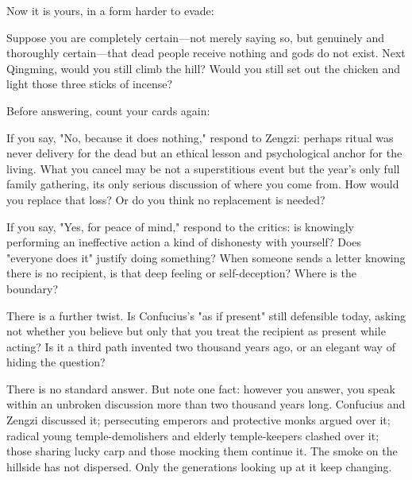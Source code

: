 Now it is yours, in a form harder to evade:

Suppose you are completely certain---not merely saying so, but genuinely and thoroughly certain---that dead people receive nothing and gods do not exist. Next Qingming, would you still climb the hill? Would you still set out the chicken and light those three sticks of incense?

Before answering, count your cards again:

If you say, "No, because it does nothing," respond to Zengzi: perhaps ritual was never delivery for the dead but an ethical lesson and psychological anchor for the living. What you cancel may be not a superstitious event but the year's only full family gathering, its only serious discussion of where you come from. How would you replace that loss? Or do you think no replacement is needed?

If you say, "Yes, for peace of mind," respond to the critics: is knowingly performing an ineffective action a kind of dishonesty with yourself? Does "everyone does it" justify doing something? When someone sends a letter knowing there is no recipient, is that deep feeling or self-deception? Where is the boundary?

There is a further twist. Is Confucius's "as if present" still defensible today, asking not whether you believe but only that you treat the recipient as present while acting? Is it a third path invented two thousand years ago, or an elegant way of hiding the question?

There is no standard answer. But note one fact: however you answer, you speak within an unbroken discussion more than two thousand years long. Confucius and Zengzi discussed it; persecuting emperors and protective monks argued over it; radical young temple-demolishers and elderly temple-keepers clashed over it; those sharing lucky carp and those mocking them continue it. The smoke on the hillside has not dispersed. Only the generations looking up at it keep changing.
